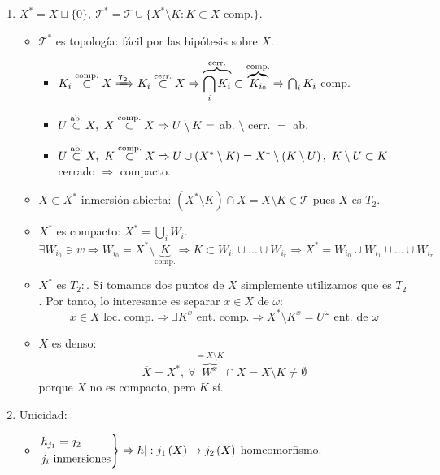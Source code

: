 \begin{demo}
\begin{enumerate}
    \item $X^* = X \sqcup \{0\},\ \mathcal{T}^* = \mathcal{T} \cup \{X^* \setminus K: K \subset X \text{ comp.}\}$.
    \begin{itemize}
        \item $\mathcal{T}^*$ es topología: fácil por las hipótesis sobre $X$.
        \begin{itemize}
            \item $K_i \stackrel{\text{comp.}}{\subset} X \xRightarrow{T_2} K_i \stackrel{\text{cerr.}}{\subset} X \Rightarrow \overbrace{\bigcap_{i} K_i}^{\text{cerr.}} \subset \overbrace{K_{i_0}}^{\text{comp.}} \Rightarrow \bigcap_{i} K_i$ comp.
            \item $U \stackrel{\text{ab.}}{\subset} X,\ X \stackrel{\text{comp.}}{\subset} X \Rightarrow U \setminus K =$ ab. $\setminus$ cerr. $ = $ ab.
            \item $U \stackrel{\text{ab.}}{\subset} X,\ K \stackrel{\text{comp.}}{\subset} X \Rightarrow U \cup \left( X^* \setminus K \right) = X^* \setminus \left( K \setminus U \right),\ K \setminus U \subset K$ cerrado $\Rightarrow$ compacto.
        \end{itemize}
        \item $X \subset X^*$ inmersión abierta: $\left( X^* \setminus K \right) \cap X = X \setminus K \in \mathcal{T}$ pues $X$ es $T_2$.
        \item $X^*$ es compacto: $X^* = \bigcup_{i} W_i$.
        \[
        \exists W_{i_0} \ni w \Rightarrow W_{i_0} = X^* \setminus \underbrace{K}_{\text{comp.}} \Rightarrow K \subset W_{i_1} \cup \ldots \cup W_{i_r} \Rightarrow X^* = W_{i_0} \cup W_{i_1} \cup \ldots \cup W_{i_r}  
        \]
        \item $X^*$ es $T_2:$. Si tomamos dos puntos de $X$ simplemente utilizamos que es $T_2$. Por tanto, lo interesante es separar $x \in X$ de $\omega$:
        \[
        x \in X \text{ loc. comp.} \Rightarrow \exists K^x \text{ ent. comp.} \Rightarrow X^* \setminus K^x = U^{\omega} \text{ ent. de } \omega
        \]

        \item $X$ es denso: %
        \[
        \overline{X} = X^*,\ \forall \overbrace{W^x}^{= X \setminus K} \cap X = X \setminus K \neq \emptyset
        \]
        porque $X$ no es compacto, pero $K$ sí.
    \end{itemize}

    \item Unicidad:
    \begin{itemize}
        \item $\begin{rcases}
           h_{j_1} = j_2\\
           j_i \text{ inmersiones} 
        \end{rcases} \Rightarrow h|: j_1\left( X \right) \rightarrow j_2 \left( X \right)$ homeomorfismo.


\end{itemize}
\end{enumerate}
\end{demo}
